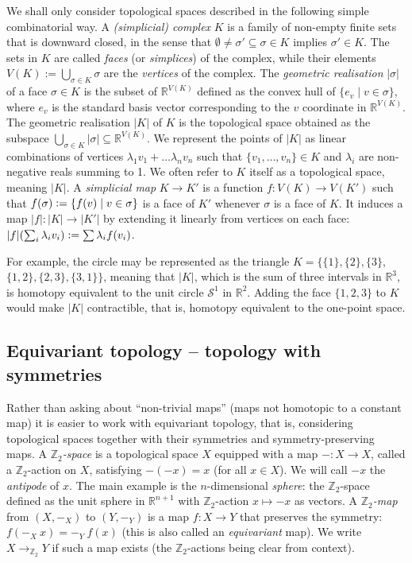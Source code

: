 \documentclass[11pt,a4paper]{scrartcl}
\numberwithin{theorem}{section}
\theoremstyle{definition}
\newcommand{\ZZ}{\mathbb{Z}}
\newcommand{\RR}{\mathbb{R}}
\newcommand{\defeq}{\vcentcolon=}
\newcommand\Sphere{\mathcal{S}}
\begin{document}
We shall only consider topological spaces described in the following simple combinatorial way.
A \emph{(simplicial) complex} $K$ is a family of non-empty finite sets that is downward closed, in the sense that $\emptyset \neq \sigma'\subseteq \sigma \in K$ implies $\sigma' \in K$.
The sets in $K$ are called \emph{faces} (or \emph{simplices}) of the complex, while their elements $V(K) := \bigcup_{\sigma \in K} \sigma$ are the \emph{vertices} of the complex.
The \emph{geometric realisation} $|\sigma|$ of a face $\sigma \in K$ is the subset of $\RR^{V(K)}$ defined as the convex hull of $\{e_v \mid v \in \sigma\}$, where $e_v$ is the standard basis vector corresponding to the $v$ coordinate in $\RR^{V(K)}$.
The geometric realisation $|K|$ of $K$ is the topological space obtained as the subspace $\bigcup_{\sigma \in K} |\sigma| \subseteq \RR^{V(K)}$.
We represent the points of $|K|$ as linear combinations of vertices $\lambda_1 v_1 + \dots \lambda_n v_n$ such that $\{v_1,\dots,v_n\}\in K$ and $\lambda_i$ are non-negative reals summing to 1.
We often refer to $K$ itself as a topological space, meaning $|K|$.
A \emph{simplicial map} $K\to K'$ is a function $f \colon V(K) \to V(K')$ such that $f(\sigma) \defeq \{f(v) \mid v\in \sigma\}$ is a face of $K'$ whenever $\sigma$ is a face of $K$.
It induces a map $|f|\colon|K|\to |K'|$ by extending it linearly from vertices on each face: $|f|(\sum_i \lambda_i v_i) \defeq \sum \lambda_i f(v_i)$.

For example, the circle may be represented as the triangle $K=\{\{1\},\{2\},\{3\}, $ $\{1,2\}, \{2,3\}, \{3,1\}\}$, meaning that $|K|$, which is the sum of three intervals in $\RR^3$, is homotopy equivalent to the unit circle $\Sphere^1$ in $\RR^2$. Adding the face $\{1,2,3\}$ to $K$ would make $|K|$ contractible, that is, homotopy equivalent to the one-point space.

\subsection*{Equivariant topology -- topology with symmetries}
Rather than asking about ``non-trivial maps'' (maps not homotopic to a constant map) it is easier to work with equivariant topology, that is, considering topological spaces together with their symmetries and symmetry-preserving maps.
A \emph{$\ZZ_2$-space} is a topological space $X$ equipped with a map $-: X \to X$, called a $\ZZ_2$-action on $X$, satisfying $-(-x) = x$ (for all $x\in X$).
We will call $-x$ the \emph{antipode} of $x$.
The main example is the $n$-dimensional \emph{sphere}: the $\ZZ_2$-space defined as the unit sphere in $\RR^{n+1}$ with $\ZZ_2$-action $x \mapsto -x$ as vectors.
A \emph{$\ZZ_2$-map} from $(X,-_X)$ to $(Y,-_Y)$ is a map $f: X \to Y$ that preserves the symmetry: $f(-_X\ x) = -_Y\ f(x)$ (this is also called an \emph{equivariant} map).
We write $X \to_{\ZZ_2} Y$ if such a map exists (the $\ZZ_2$-actions being clear from context).
\end{document}

